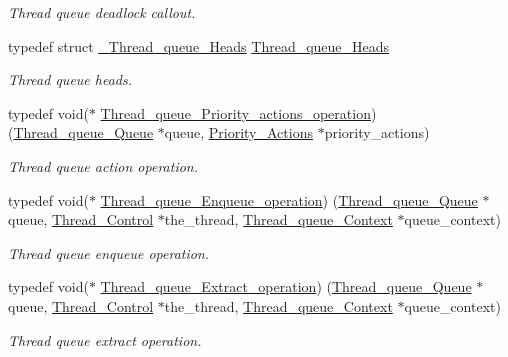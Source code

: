 \begin{DoxyCompactItemize}
\begin{DoxyCompactList}\small\item\em Thread queue deadlock callout. \end{DoxyCompactList}\item 
typedef struct \mbox{\hyperlink{struct__Thread__queue__Heads}{\+\_\+\+Thread\+\_\+queue\+\_\+\+Heads}} \mbox{\hyperlink{group__RTEMSScoreThreadQueue_gaebac32033b009cc8f606a90bd389f8e9}{Thread\+\_\+queue\+\_\+\+Heads}}
\begin{DoxyCompactList}\small\item\em Thread queue heads. \end{DoxyCompactList}\item 
typedef void($\ast$ \mbox{\hyperlink{group__RTEMSScoreThreadQueue_gacdacb1750c6bbc43f99e9c60bd1beba9}{Thread\+\_\+queue\+\_\+\+Priority\+\_\+actions\+\_\+operation}}) (\mbox{\hyperlink{structThread__queue__Queue}{Thread\+\_\+queue\+\_\+\+Queue}} $\ast$queue, \mbox{\hyperlink{structPriority__Actions}{Priority\+\_\+\+Actions}} $\ast$priority\+\_\+actions)
\begin{DoxyCompactList}\small\item\em Thread queue action operation. \end{DoxyCompactList}\item 
typedef void($\ast$ \mbox{\hyperlink{group__RTEMSScoreThreadQueue_ga1d111ef0f5c9457f7e17a217fc7558cd}{Thread\+\_\+queue\+\_\+\+Enqueue\+\_\+operation}}) (\mbox{\hyperlink{structThread__queue__Queue}{Thread\+\_\+queue\+\_\+\+Queue}} $\ast$queue, \mbox{\hyperlink{struct__Thread__Control}{Thread\+\_\+\+Control}} $\ast$the\+\_\+thread, \mbox{\hyperlink{structThread__queue__Context}{Thread\+\_\+queue\+\_\+\+Context}} $\ast$queue\+\_\+context)
\begin{DoxyCompactList}\small\item\em Thread queue enqueue operation. \end{DoxyCompactList}\item 
typedef void($\ast$ \mbox{\hyperlink{group__RTEMSScoreThreadQueue_ga7fdee2ebb4fe9f9dae612be0ecce85db}{Thread\+\_\+queue\+\_\+\+Extract\+\_\+operation}}) (\mbox{\hyperlink{structThread__queue__Queue}{Thread\+\_\+queue\+\_\+\+Queue}} $\ast$queue, \mbox{\hyperlink{struct__Thread__Control}{Thread\+\_\+\+Control}} $\ast$the\+\_\+thread, \mbox{\hyperlink{structThread__queue__Context}{Thread\+\_\+queue\+\_\+\+Context}} $\ast$queue\+\_\+context)
\begin{DoxyCompactList}\small\item\em Thread queue extract operation. \end{DoxyCompactList}\item 

\end{DoxyCompactItemize}
